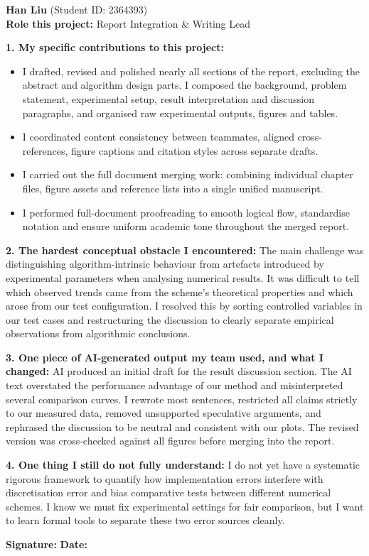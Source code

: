 \begin{formbox}

\textbf{Han Liu} (Student ID: 2364393)\\
\textbf{Role this project:} Report Integration \& Writing Lead

\textbf{1. My specific contributions to this project:}
\begin{itemize}[leftmargin=1.3em,itemsep=1pt,topsep=1pt]
    \item I drafted, revised and polished nearly all sections of the report, excluding the abstract and algorithm design parts. I composed the background, problem statement, experimental setup, result interpretation and discussion paragraphs, and organised raw experimental outputs, figures and tables.
    \item I coordinated content consistency between teammates, aligned cross-references, figure captions and citation styles across separate drafts.
    \item I carried out the full document merging work: combining individual chapter files, figure assets and reference lists into a single unified manuscript.
    \item I performed full-document proofreading to smooth logical flow, standardise notation and ensure uniform academic tone throughout the merged report.
\end{itemize}

\textbf{2. The hardest conceptual obstacle I encountered:}
The main challenge was distinguishing algorithm-intrinsic behaviour from artefacts introduced by experimental parameters when analysing numerical results. It was difficult to tell which observed trends came from the scheme’s theoretical properties and which arose from our test configuration. I resolved this by sorting controlled variables in our test cases and restructuring the discussion to clearly separate empirical observations from algorithmic conclusions.

\textbf{3. One piece of AI-generated output my team used, and what I changed:}
AI produced an initial draft for the result discussion section. The AI text overstated the performance advantage of our method and misinterpreted several comparison curves. I rewrote most sentences, restricted all claims strictly to our measured data, removed unsupported speculative arguments, and rephrased the discussion to be neutral and consistent with our plots. The revised version was cross-checked against all figures before merging into the report.

\textbf{4. One thing I still do not fully understand:}
I do not yet have a systematic rigorous framework to quantify how implementation errors interfere with discretisation error and bias comparative tests between different numerical schemes. I know we must fix experimental settings for fair comparison, but I want to learn formal tools to separate these two error sources cleanly.

\textbf{Signature:} \underline{\hspace{4.5cm}} \hfill
\textbf{Date:} \underline{\hspace{2.5cm}}
\end{formbox}
